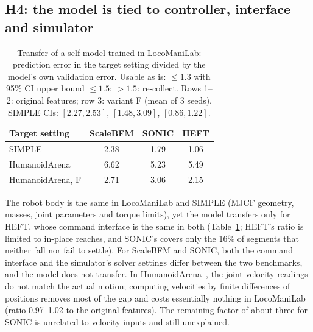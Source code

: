 \documentclass[conference]{IEEEtran}
\begin{document}
\subsection{H4: the model is tied to controller, interface and simulator}\label{sec:h4}
\begin{table}[t]
\centering
\caption{Transfer of a self-model trained in LocoManiLab: prediction error in the target setting divided by the model's own validation error. Usable as is: $\le 1.3$ with 95\% CI upper bound $\le 1.5$; $>1.5$: re-collect. Rows 1--2: original features; row 3: variant F (mean of 3 seeds). SIMPLE CIs: $[2.27,2.53]$, $[1.48,3.09]$, $[0.86,1.22]$.}
\label{tab:xfer}
\begin{tabular}{lccc}
\toprule
Target setting & ScaleBFM & SONIC & HEFT \\
\midrule
SIMPLE & 2.38 & 1.79 & 1.06 \\
HumanoidArena & 6.62 & 5.23 & 5.49 \\
HumanoidArena, F & 2.71 & 3.06 & 2.15 \\
\bottomrule
\end{tabular}
\end{table}

The robot body is the same in LocoManiLab and SIMPLE (MJCF geometry, masses, joint parameters and torque limits), yet the model transfers only for HEFT, whose command interface is the same in both (Table~\ref{tab:xfer}; HEFT's ratio is limited to in-place reaches, and SONIC's covers only the 16\% of segments that neither fall nor fail to settle). For ScaleBFM and SONIC, both the command interface and the simulator's solver settings differ between the two benchmarks, and the model does not transfer. In HumanoidArena~\cite{humanoidarena}, the joint-velocity readings do not match the actual motion; computing velocities by finite differences of positions removes most of the gap and costs essentially nothing in LocoManiLab (ratio 0.97--1.02 to the original features). The remaining factor of about three for SONIC is unrelated to velocity inputs and still unexplained.
\end{document}
